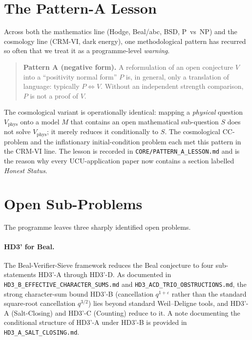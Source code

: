 \documentclass[11pt,a4paper]{article}
\theoremstyle{remark}
\begin{document}
\section{The Pattern-A Lesson}
\label{sec:pattern-a}

Across both the mathematics line (Hodge, Beal/abc, BSD, P~vs~NP) and
the cosmology line (CRM-VI, dark energy), one methodological pattern
has recurred so often that we treat it as a programme-level
\emph{warning}.

\begin{quote}
\textbf{Pattern A (negative form).}
A reformulation of an open conjecture $V$ into a ``positivity
normal form'' $P$ is, in general, only a translation of language:
typically $P \Leftrightarrow V$. Without an independent strength
comparison, $P$ is not a proof of $V$.
\end{quote}

\noindent The cosmological variant is operationally identical:
mapping a \emph{physical} question $V_{\text{phys}}$ onto a model
$M$ that contains an open mathematical sub-question $S$ does not
solve $V_{\text{phys}}$; it merely reduces it conditionally to $S$.
The cosmological CC-problem and the inflationary initial-condition
problem each met this pattern in the CRM-VI line. The lesson is
recorded in \texttt{CORE/PATTERN\_A\_LESSON.md} and is the reason
why every UCU-application paper now contains a section labelled
\emph{Honest Status}.

\section{Open Sub-Problems}
\label{sec:open}

The programme leaves three sharply identified open problems.

\paragraph{HD3' for Beal.}
The Beal-Verifier-Sieve framework reduces the Beal conjecture to four
sub-statements HD3'-A through HD3'-D. As documented in
\texttt{HD3\_B\_EFFECTIVE\_CHARACTER\_SUMS.md} and
\texttt{HD3\_ACD\_TRIO\_OBSTRUCTIONS.md}, the strong character-sum
bound HD3'-B (cancellation $q^{1+\varepsilon}$ rather than the
standard square-root cancellation $q^{3/2}$) lies beyond standard
Weil--Deligne tools, and HD3'-A (Salt-Closing) and HD3'-C (Counting)
reduce to it. A note documenting the conditional structure of HD3'-A
under HD3'-B is provided in \texttt{HD3\_A\_SALT\_CLOSING.md}.
\end{document}
